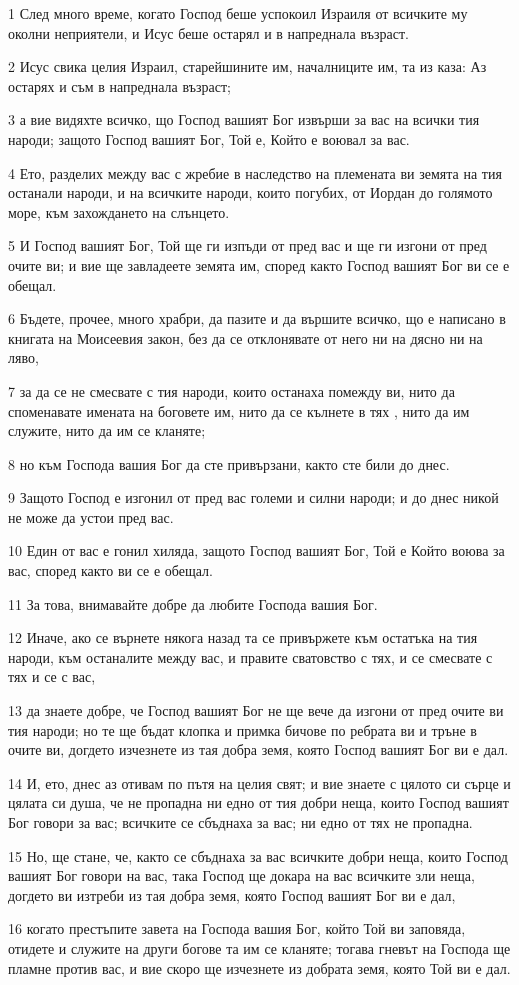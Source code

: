 \par 1 След много време, когато Господ беше успокоил Израиля от всичките му околни неприятели, и Исус беше остарял и в напреднала възраст.
\par 2 Исус свика целия Израил, старейшините им, началниците им, та из каза: Аз остарях и съм в напреднала възраст;
\par 3 а вие видяхте всичко, що Господ вашият Бог извърши за вас на всички тия народи; защото Господ вашият Бог, Той е, Който е воювал за вас.
\par 4 Ето, разделих между вас с жребие в наследство на племената ви земята на тия останали народи, и на всичките народи, които погубих, от Иордан до голямото море, към захождането на слънцето.
\par 5 И Господ вашият Бог, Той ще ги изпъди от пред вас и ще ги изгони от пред очите ви; и вие ще завладеете земята им, според както Господ вашият Бог ви се е обещал.
\par 6 Бъдете, прочее, много храбри, да пазите и да вършите всичко, що е написано в книгата на Моисеевия закон, без да се отклонявате от него ни на дясно ни на ляво,
\par 7 за да се не смесвате с тия народи, които останаха помежду ви, нито да споменавате имената на боговете им, нито да се кълнете в тях , нито да им служите, нито да им се кланяте;
\par 8 но към Господа вашия Бог да сте привързани, както сте били до днес.
\par 9 Защото Господ е изгонил от пред вас големи и силни народи; и до днес никой не може да устои пред вас.
\par 10 Един от вас е гонил хиляда, защото Господ вашият Бог, Той е Който воюва за вас, според както ви се е обещал.
\par 11 За това, внимавайте добре да любите Господа вашия Бог.
\par 12 Иначе, ако се върнете някога назад та се привържете към остатъка на тия народи, към останалите между вас, и правите сватовство с тях, и се смесвате с тях и се с вас,
\par 13 да знаете добре, че Господ вашият Бог не ще вече да изгони от пред очите ви тия народи; но те ще бъдат клопка и примка бичове по ребрата ви и тръне в очите ви, догдето изчезнете из тая добра земя, която Господ вашият Бог ви е дал.
\par 14 И, ето, днес аз отивам по пътя на целия свят; и вие знаете с цялото си сърце и цялата си душа, че не пропадна ни едно от тия добри неща, които Господ вашият Бог говори за вас; всичките се сбъднаха за вас; ни едно от тях не пропадна.
\par 15 Но, ще стане, че, както се сбъднаха за вас всичките добри неща, които Господ вашият Бог говори на вас, така Господ ще докара на вас всичките зли неща, догдето ви изтреби из тая добра земя, която Господ вашият Бог ви е дал,
\par 16 когато престъпите завета на Господа вашия Бог, който Той ви заповяда, отидете и служите на други богове та им се кланяте; тогава гневът на Господа ще пламне против вас, и вие скоро ще изчезнете из добрата земя, която Той ви е дал.

